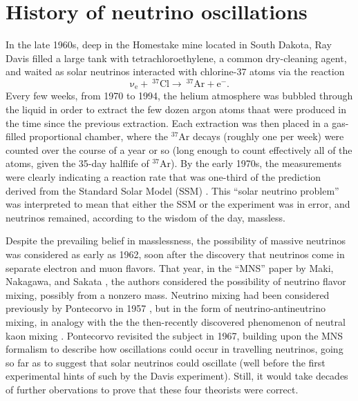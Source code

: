 \documentclass[../thesis.tex]{subfiles}
\begin{document}
\section{History of neutrino oscillations}
\label{sec:history}

In the late 1960s, deep in the Homestake mine located in South Dakota, Ray Davis filled a large tank with tetrachloroethylene, a common dry-cleaning agent, and waited as solar neutrinos interacted with chlorine-37 atoms via the reaction
\begin{equation*}
  \mathrm{\nu_e + \ ^{37}Cl \longrightarrow \ ^{37}Ar + e^-.}  
\end{equation*}
Every few weeks, from 1970 to 1994, the helium atmosphere was bubbled through the liquid in order to extract the few dozen argon atoms thaat were produced in the time since the previous extraction. Each extraction was then placed in a gas-filled proportional chamber, where the $^{37}$Ar decays (roughly one per week) were counted over the course of a year or so (long enough to count effectively all of the atoms, given the 35-day halflife of $^{37}$Ar). By the early 1970s, the measurements were clearly indicating a reaction rate that was one-third of the prediction derived from the Standard Solar Model (SSM) \cite{DAVIS199413}. This ``solar neutrino problem'' was interpreted to mean that either the SSM or the experiment was in error, and neutrinos remained, according to the wisdom of the day, massless.

Despite the prevailing belief in masslessness, the possibility of massive neutrinos was considered as early as 1962, soon after the discovery that neutrinos come in separate electron and muon flavors. That year, in the ``MNS'' paper by Maki, Nakagawa, and Sakata \cite{10.1143/PTP.28.870}, the authors considered the possibility of neutrino flavor mixing, possibly from a nonzero mass. Neutrino mixing had been considered previously by Pontecorvo in 1957 \cite{Pontecorvo:1957cp}, but in the form of neutrino-antineutrino mixing, in analogy with the the then-recently discovered phenomenon of neutral kaon mixing \cite{PhysRevLett.13.138}. Pontecorvo revisited the subject in 1967, building upon the MNS formalism to describe how oscillations could occur in travelling neutrinos, going so far as to suggest that solar neutrinos could oscillate (well before the first experimental hints of such by the Davis experiment). Still, it would take decades of further obervations to prove that these four theorists were correct.
\end{document}

